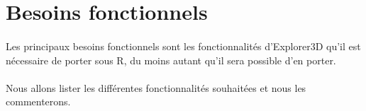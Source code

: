 \section{Besoins fonctionnels}
\paragraph{} Les principaux besoins fonctionnels sont les fonctionnalités d'Explorer3D qu'il est nécessaire de porter sous R, du moins autant qu'il sera possible d'en porter.
\paragraph{} Nous allons lister les différentes fonctionnalités souhaitées et nous les commenterons.
\newpage